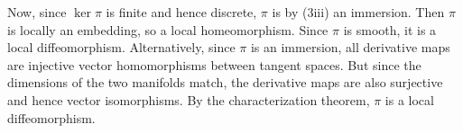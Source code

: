\documentclass[a4paper, 12pt]{article}
\begin{document}
\begin{Exercise}
\begin{enumerate}[label=(\roman*)]
            Now, since $\ker \pi$ is finite and hence discrete, $\pi$ is by (3iii) an immersion.
            Then $\pi$ is locally an embedding, so a local homeomorphism.
            Since $\pi$ is smooth, it is a local diffeomorphism.
            Alternatively, since $\pi$ is an immersion, all derivative maps are injective vector homomorphisms between tangent spaces.
            But since the dimensions of the two manifolds match, the derivative maps are also surjective and hence vector isomorphisms.
            By the characterization theorem, $\pi$ is a local diffeomorphism.
    \end{enumerate}
\end{Exercise}
\end{document}
